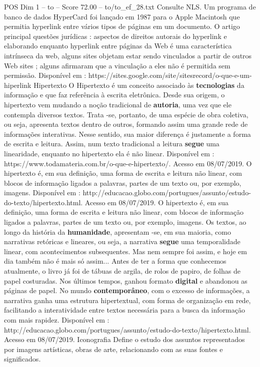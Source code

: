\begin{textsample}{POS Dim 1 – to – Score 72.00 – to/to\_ef\_28.txt}
Consulte NLS.
Um programa de banco de dados HyperCard foi lançado em 1987 para o Apple Macintosh que permitia hyperlink entre vários tipos de páginas em um documento.
O artigo principal questões jurídicas : aspectos de direitos autorais do hyperlink e elaborando enquanto hyperlink entre páginas da Web é uma característica intrínseca da web, alguns sites objetam estar sendo vinculados a partir de outros Web sites ; alguns afirmaram que a vinculação a eles não é permitida sem permissão.
Disponível em : https://sites.google.com/site/sitesrecord/o-que-e-um-hiperlink Hipertexto O Hipertexto é um conceito associado às \textbf{tecnologias} da informação e que faz referência à escrita eletrônica.
Desde sua origem, o hipertexto vem mudando a noção tradicional de \textbf{autoria}, uma vez que ele contempla diversos textos.
Trata -se, portanto, de uma espécie de obra coletiva, ou seja, apresenta textos dentro de outros, formando assim uma grande rede de informações interativas.
Nesse sentido, sua maior diferença é justamente a forma de escrita e leitura.
Assim, num texto tradicional a leitura \textbf{segue} uma linearidade, enquanto no hipertexto ela é não linear.
Disponível em : https://www.todamateria.com.br/o-que-e-hipertexto/.
Acesso em 08/07/2019.
O hipertexto é, em sua definição, uma forma de escrita e leitura não linear, com blocos de informação ligados a palavras, partes de um texto ou, por exemplo, imagens.
Disponível em : http://educacao.globo.com/portugues/assunto/estudo-do-texto/hipertexto.html.
Acesso em 08/07/2019.
O hipertexto é, em sua definição, uma forma de escrita e leitura não linear, com blocos de informação ligados a palavras, partes de um texto ou, por exemplo, imagens.
Os textos, ao longo da história da \textbf{humanidade}, apresentam -se, em sua maioria, como narrativas retóricas e lineares, ou seja, a narrativa \textbf{segue} uma temporalidade linear, com acontecimentos subsequentes.
Mas nem sempre foi assim, e hoje em dia também não é mais só assim...
Antes de ter a forma que conhecemos atualmente, o livro já foi de tábuas de argila, de rolos de papiro, de folhas de papel costuradas.
Nos últimos tempos, ganhou formato \textbf{digital} e abandonou as páginas de papel.
No mundo \textbf{contemporâneo}, com o excesso de informações, a narrativa ganha uma estrutura hipertextual, com forma de organização em rede, facilitando a interatividade entre textos necessária para a busca da informação com mais rapidez.
Disponível em : http://educacao.globo.com/portugues/assunto/estudo-do-texto/hipertexto.html.
Acesso em 08/07/2019.
Iconografia Define o estudo dos assuntos representados por imagens artísticas, obras de arte, relacionando com as suas fontes e significados.

\end{textsample}
